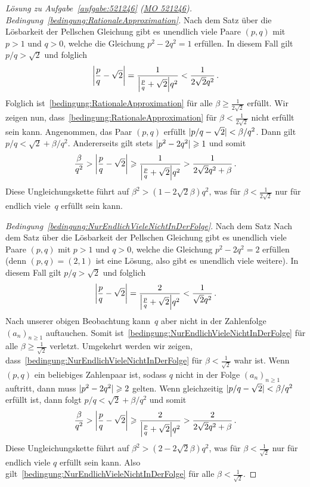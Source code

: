 \begin{proof}[Lösung zu Aufgabe~\ref{aufgabe:521246} \textmd{(\href{https://www.mathematik-olympiaden.de/moev/index.php?option=com_download&thema=a&datei=A52124b.pdf&format=raw}{MO 521246})}]
	\emph{Bedingung~\ref{bedingung:RationaleApproximation}.} Nach dem Satz über die Lösbarkeit der Pellschen Gleichung gibt es unendlich viele Paare $(p,q)$ mit $p>1$ und $q>0$, welche die Gleichung $p^2-2q^2=1$ erfüllen. In diesem Fall gilt $p/q>\sqrt{2}$ und folglich
	\begin{equation*}
		\abs*{\frac pq-\sqrt{2}}=\frac{1}{\abs*{\frac{p}{q}+\sqrt{2}}q^2}<\frac{1}{2\sqrt{2}q^2}\,.
	\end{equation*}
	Folglich ist~\ref{bedingung:RationaleApproximation} für alle $\beta\geqslant \frac{1}{2\sqrt{2}}$ erfüllt. Wir zeigen nun, dass~\ref{bedingung:RationaleApproximation} für $\beta<\frac{1}{2\sqrt{2}}$ nicht erfüllt sein kann. Angenommen, das Paar $(p,q)$ erfüllt $\lvert p/q-\sqrt{2}\rvert<\beta/q^2$. Dann gilt $p/q<\sqrt{2}+\beta/q^2$. Andererseits gilt stets $\lvert p^2-2q^2\rvert\geqslant 1$ und somit
	\begin{equation*}
		\frac{\beta}{q^2}>\abs*{\frac pq-\sqrt{2}}\geqslant \frac{1}{\abs*{\frac{p}{q}+\sqrt{2}}q^2}>\frac{1}{2\sqrt{2}q^2+\beta}\,.
	\end{equation*}
	Diese Ungleichungskette führt auf $\beta^2>(1-2\sqrt{2}\beta)q^2$, was für $\beta<\frac1{2\sqrt{2}}$ nur für endlich viele~$q$ erfüllt sein kann.
	
	\emph{Bedingung~\ref{bedingung:NurEndlichVieleNichtInDerFolge}}. Nach dem Satz Nach dem Satz über die Lösbarkeit der Pellschen Gleichung gibt es unendlich viele Paare $(p,q)$ mit $p>1$ und $q>0$, welche die Gleichung $p^2-2q^2=2$ erfüllen (denn $(p,q)=(2,1)$ ist eine Lösung, also gibt es unendlich viele weitere). In diesem Fall gilt $p/q>\sqrt{2}$ und folglich
	\begin{equation*}
		\abs*{\frac pq-\sqrt{2}}=\frac{2}{\abs*{\frac{p}{q}+\sqrt{2}}q^2}<\frac{1}{\sqrt{2}q^2}\,.
	\end{equation*}
	Nach unserer obigen Beobachtung kann~$q$ aber nicht in der Zahlenfolge $(a_n)_{n\geqslant 1}$ auftauchen. Somit ist~\ref{bedingung:NurEndlichVieleNichtInDerFolge} für alle $\beta\geqslant \frac{1}{\sqrt{2}}$ verletzt. Umgekehrt werden wir zeigen, dass~\ref{bedingung:NurEndlichVieleNichtInDerFolge} für $\beta<\frac{1}{\sqrt{2}}$ wahr ist. Wenn $(p,q)$ ein beliebiges Zahlenpaar ist, sodass $q$ nicht in der Folge $(a_n)_{n\geqslant 1}$ auftritt, dann muss $\lvert p^2-2q^2\rvert\geqslant 2$ gelten. Wenn gleichzeitig $\lvert p/q-\sqrt{2}\rvert<\beta/q^2$ erfüllt ist, dann folgt $p/q<\sqrt{2}+\beta/q^2$ und somit
	\begin{equation*}
		\frac{\beta}{q^2}>\abs*{\frac pq-\sqrt{2}}\geqslant \frac{2}{\abs*{\frac{p}{q}+\sqrt{2}}q^2}>\frac{2}{2\sqrt{2}q^2+\beta}\,.
	\end{equation*}
	Diese Ungleichungskette führt auf $\beta^2>(2-2\sqrt{2}\beta)q^2$, was für $\beta<\frac1{\sqrt{2}}$ nur für endlich viele $q$ erfüllt sein kann. Also gilt~\ref{bedingung:NurEndlichVieleNichtInDerFolge} für alle $\beta<\frac{1}{\sqrt{2}}$.
	

\end{proof}
